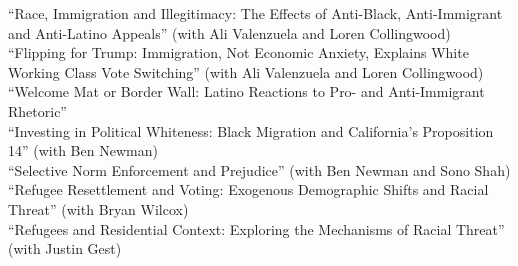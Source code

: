 \documentclass[11pt, a4paper]{article}
\newcommand{\years}[1]{\marginnote{\scriptsize #1}}
\begin{document}
\years{}``Race, Immigration and Illegitimacy: The Effects of Anti-Black, Anti-Immigrant and Anti-Latino Appeals'' (with Ali Valenzuela and Loren Collingwood)\\
\years{}``Flipping for Trump: Immigration, Not Economic Anxiety, Explains White
Working Class Vote Switching'' (with Ali Valenzuela and Loren Collingwood)\\
\years{}``Welcome Mat or Border Wall: Latino Reactions to Pro- and Anti-Immigrant Rhetoric''\\
\years{}``Investing in Political Whiteness: Black Migration and California's Proposition 14'' (with Ben Newman)\\
\years{}``Selective Norm Enforcement and Prejudice'' (with Ben Newman and Sono Shah)\\
\years{}``Refugee Resettlement and Voting: Exogenous Demographic Shifts and Racial Threat'' (with Bryan Wilcox)\\
\years{}``Refugees and Residential Context: Exploring the Mechanisms of Racial Threat'' (with Justin Gest)\\
\end{document}
